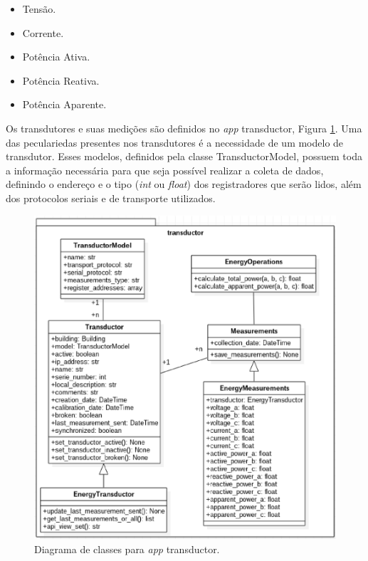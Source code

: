 \begin{itemize}
    \item Tensão.
    \item Corrente.
    \item Potência Ativa.
    \item Potência Reativa.
    \item Potência Aparente.
\end{itemize}

Os transdutores e suas medições são definidos no \textit{app} transductor, Figura \ref{transductor}. Uma das peculariedas presentes nos transdutores é a necessidade de um modelo de transdutor. Esses modelos, definidos pela classe TransductorModel, possuem toda a informação necessária para que seja possível realizar a coleta de dados, definindo o endereço e o tipo (\textit{int} ou \textit{float}) dos registradores que serão lidos, além dos protocolos seriais e de transporte utilizados.

\begin{figure}[!h]
    \centering
    \includegraphics[keepaspectratio=true,scale=0.7]{figuras/transductor.eps}
    \caption{Diagrama de classes para \textit{app} transductor.}
    \label{transductor}
\end{figure}

